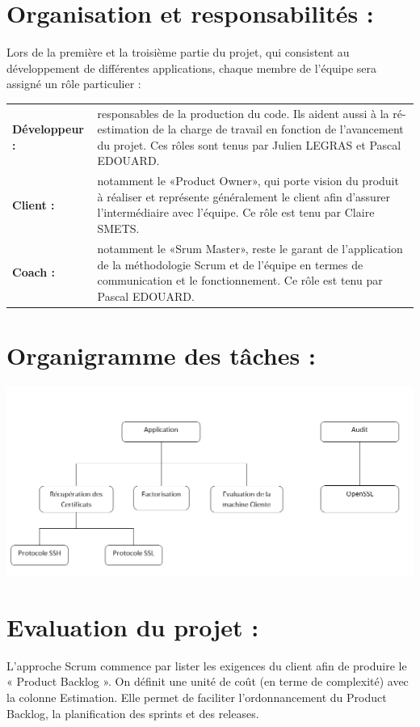 \documentclass[a4paper,11pt,french]{article}
\begin{document}
\section{Organisation et responsabilités :}

Lors de la première et la troisième partie du projet, qui consistent au développement de différentes applications, chaque membre de l'équipe sera assigné un rôle particulier :\\

\begin{tabular}{l p{15cm}}
\textbf{Développeur :} & responsables de la production du code. Ils aident aussi à la ré-estimation de la charge de travail en fonction de l'avancement du projet. Ces rôles sont tenus par Julien LEGRAS et Pascal EDOUARD. \\
\textbf{Client :}& notamment le «Product Owner», qui porte vision du produit à réaliser et représente généralement le client afin d'assurer l'intermédiaire avec l'équipe. Ce rôle est tenu par Claire SMETS.\\
\textbf{Coach :}&  notamment le «Srum Master», reste le garant de l'application de la méthodologie Scrum et de l'équipe en termes de communication et le fonctionnement. Ce rôle est tenu par Pascal EDOUARD.
\end{tabular}

\newpage

\section{Organigramme des tâches :}
\includegraphics[width=45em]{organigramme.png}

\section{Evaluation du projet :}

L'approche Scrum commence par lister les exigences du client afin de produire le « Product Backlog ». On définit une unité de coût (en terme de complexité) avec la colonne Estimation. Elle permet de faciliter l'ordonnancement du Product Backlog, la planification des sprints et des releases.
\end{document}
